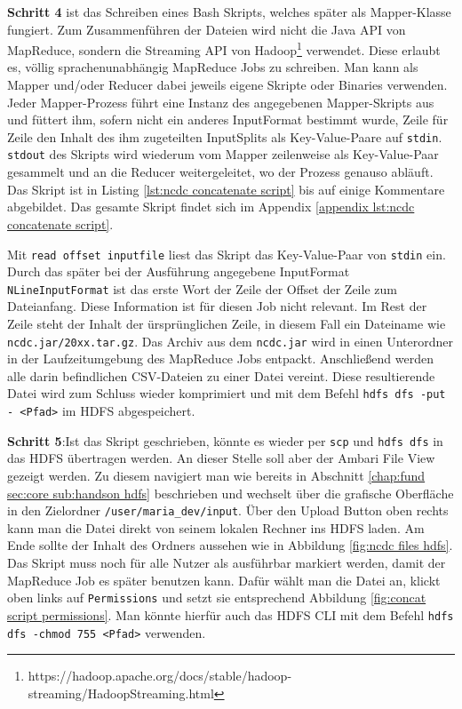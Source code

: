 \textbf{Schritt 4} ist das Schreiben eines Bash Skripts, welches später als Mapper-Klasse fungiert. Zum Zusammenführen der Dateien wird nicht die Java API von MapReduce, sondern die Streaming API von Hadoop\footnote{https://hadoop.apache.org/docs/stable/hadoop-streaming/HadoopStreaming.html} verwendet. Diese erlaubt es, völlig sprachenunabhängig MapReduce Jobs zu schreiben. Man kann als Mapper und/oder Reducer dabei jeweils eigene Skripte oder Binaries verwenden. Jeder Mapper-Prozess führt eine Instanz des angegebenen Mapper-Skripts aus und füttert ihm, sofern nicht ein anderes InputFormat bestimmt wurde, Zeile für Zeile den Inhalt des ihm zugeteilten InputSplits als Key-Value-Paare auf \verb|stdin|. \verb|stdout| des Skripts wird wiederum vom Mapper zeilenweise als Key-Value-Paar gesammelt und an die Reducer weitergeleitet, wo der Prozess genauso abläuft. Das Skript ist in Listing \ref{lst:ncdc concatenate script} bis auf einige Kommentare abgebildet. Das gesamte Skript findet sich im Appendix \ref{appendix lst:ncdc concatenate script}.    



Mit \verb|read offset inputfile| liest das Skript das Key-Value-Paar von \verb|stdin| ein. Durch das später bei der Ausführung angegebene InputFormat \verb|NLineInputFormat| ist das erste Wort der Zeile der Offset der Zeile zum Dateianfang. Diese Information ist für diesen Job nicht relevant. Im Rest der Zeile steht der Inhalt der ürsprünglichen Zeile, in diesem Fall ein Dateiname wie \verb|ncdc.jar/20xx.tar.gz|. 
Das Archiv aus dem \verb|ncdc.jar| wird in einen Unterordner in der Laufzeitumgebung des MapReduce Jobs entpackt. Anschließend werden alle darin befindlichen CSV-Dateien zu einer Datei vereint. Diese resultierende Datei wird zum Schluss wieder komprimiert und mit dem Befehl \verb|hdfs dfs -put - <Pfad>| im HDFS abgespeichert. 
\par
\textbf{Schritt 5}:Ist das Skript geschrieben, könnte es wieder per \verb|scp| und \verb|hdfs dfs| in das HDFS übertragen werden. An dieser Stelle soll aber der Ambari File View gezeigt werden. Zu diesem navigiert man wie bereits in Abschnitt \ref{chap:fund sec:core sub:handson hdfs} beschrieben und wechselt über die grafische Oberfläche in den Zielordner \verb|/user/maria_dev/input|. Über den Upload Button oben rechts kann man die Datei direkt von seinem lokalen Rechner ins HDFS laden. Am Ende sollte der Inhalt des Ordners aussehen wie in Abbildung \ref{fig:ncdc files hdfs}. Das Skript muss noch für alle Nutzer als ausführbar markiert werden, damit der MapReduce Job es später benutzen kann. Dafür wählt man die Datei an, klickt oben links auf \verb|Permissions| und setzt sie entsprechend Abbildung \ref{fig:concat script permissions}. Man könnte hierfür auch das HDFS CLI mit dem Befehl \verb|hdfs dfs -chmod 755 <Pfad>| verwenden.

